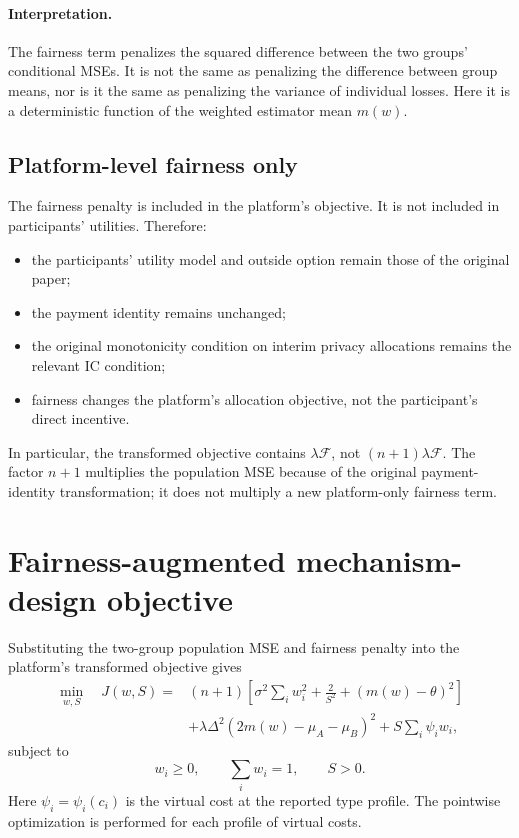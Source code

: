\documentclass[11pt,a4paper]{article}
\newcommand{\1}{\mathbf{1}}
\begin{document}
\paragraph{Interpretation.}
The fairness term penalizes the squared difference between the two
groups' conditional MSEs. It is not the same as penalizing the difference
between group means, nor is it the same as penalizing the variance of
individual losses. Here it is a deterministic function of the weighted
estimator mean \(m(w)\).

\subsection{Platform-level fairness only}

The fairness penalty is included in the platform's objective. It is not
included in participants' utilities. Therefore:
\begin{itemize}
  \item the participants' utility model and outside option remain those of
        the original paper;
  \item the payment identity remains unchanged;
  \item the original monotonicity condition on interim privacy allocations
        remains the relevant IC condition;
  \item fairness changes the platform's allocation objective, not the
        participant's direct incentive.
\end{itemize}

In particular, the transformed objective contains
\(\lambda\mathcal F\), not \((n+1)\lambda\mathcal F\). The factor \(n+1\)
multiplies the population MSE because of the original payment-identity
transformation; it does not multiply a new platform-only fairness term.

\section{Fairness-augmented mechanism-design objective}

Substituting the two-group population MSE and fairness penalty into the
platform's transformed objective gives
\begin{equation}
  \begin{aligned}
  \min_{w,S}\quad J(w,S)
  ={}&(n+1)\left[
       \sigma^2\sum_iw_i^2+\frac{2}{S^2}
       +(m(w)-\theta)^2
       \right]\\
     &+\lambda\Delta^2(2m(w)-\mu_A-\mu_B)^2
       +S\sum_i\psi_iw_i,
  \end{aligned}
  \label{eq:full-w-objective}
\end{equation}
subject to
\begin{equation}
  w_i\geq0,\qquad \sum_iw_i=1,\qquad S>0.
\end{equation}
Here \(\psi_i=\psi_i(c_i)\) is the virtual cost at the reported type
profile. The pointwise optimization is performed for each profile of
virtual costs.
\end{document}
